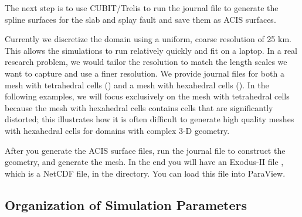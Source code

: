 The next step is to use CUBIT/Trelis to run the
 journal file to generate the spline
surfaces for the slab and splay fault and save them as ACIS
surfaces. 


Currently we discretize the domain using a uniform, coarse resolution
of 25 km. This allows the simulations to run relatively quickly and
fit on a laptop. In a real research problem, we would tailor the
resolution to match the length scales we want to capture and use a
finer resolution. We provide journal files for both a mesh with
tetrahedral cells () and a mesh with
hexahedral cells (). In the following
examples, we will focus exclusively on the mesh with tetrahedral cells
because the mesh with hexahedral cells contains cells that are
significantly distorted; this illustrates how it is often difficult to
generate high quality meshes with hexahedral cells for domains with
complex 3-D geometry.

After you generate the ACIS surface files, run the
 journal file to construct the geometry, and
generate the mesh. In the end you will have an Exodus-II file
, which is a NetCDF file, in the
 directory. You can load this file into ParaView.


\subsection{Organization of Simulation Parameters}
\label{sec:example:subduction:3d:organization}

